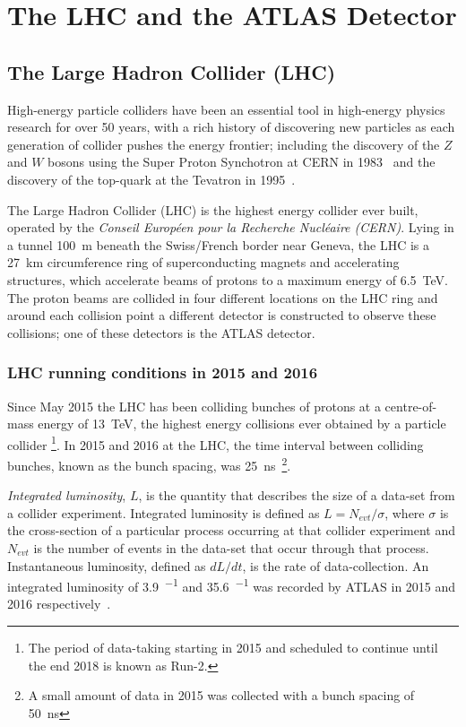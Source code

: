 \chapter{The LHC and the ATLAS Detector}
\label{sec:det}

\section{The Large Hadron Collider (LHC)}
\label{sec:det-LHC}

High-energy particle colliders have been an essential tool in high-energy physics research for over 50 years,
with a rich history of discovering new particles as each generation of collider pushes the energy frontier;
including the discovery of the $Z$ and $W$ bosons using the Super Proton Synchotron at CERN in 1983~\cite{det-Wdisc_UA1, det-Zdisc_UA1, det-Wdisc_UA2, det-Zdisc_UA2} 
and the discovery of the  top-quark at the Tevatron in 1995~\cite{det-tdisc_CDF, det-tdisc_D0}.

The Large Hadron Collider (LHC) is the highest energy collider ever built,
operated by the \textit{Conseil Europ\'een pour la Recherche Nucl\'eaire (CERN)}.
Lying in a tunnel \SI{100}{\metre} beneath the Swiss/French border near Geneva,
the LHC is a \SI{27}{\km} circumference ring of superconducting magnets and accelerating structures,
which accelerate beams of protons to a maximum energy of \SI{6.5}{\TeV}.
The proton beams are collided in four different locations on the LHC ring
and around each collision point a different detector is constructed to observe these collisions;
one of these detectors is the ATLAS detector.

\subsection{LHC running conditions in 2015 and 2016}

Since May 2015 the LHC has been colliding bunches of protons at a centre-of-mass energy of \SI{13}{\TeV},
the highest energy collisions ever obtained by a particle collider
\footnote{The period of data-taking starting in 2015 and scheduled to continue until the end 2018 is known as Run-2.}.
In 2015 and 2016 at the LHC, the time interval between colliding bunches, known as the bunch spacing, was \SI{25}{\nano\second}~\footnote{A small amount of data in 2015 was collected with a bunch spacing of \SI{50}{\nano\second}}.

\textit{Integrated luminosity}, $L$, is the quantity that describes the size of a data-set from a collider experiment.
Integrated luminosity is defined as $L = N_{evt}/\sigma$,
where $\sigma$ is the cross-section of a particular process occurring at that collider experiment
and $N_{evt}$ is the number of events in the data-set that occur through that process.
Instantaneous luminosity, defined as $dL/dt$, %
is the rate of data-collection.
An integrated luminosity of \SI{3.9}{\fb^{-1}} and \SI{35.6}{\fb^{-1}} was recorded by ATLAS in 2015 and 2016 respectively~\cite{det-ATLAS_lumi_twiki}.

